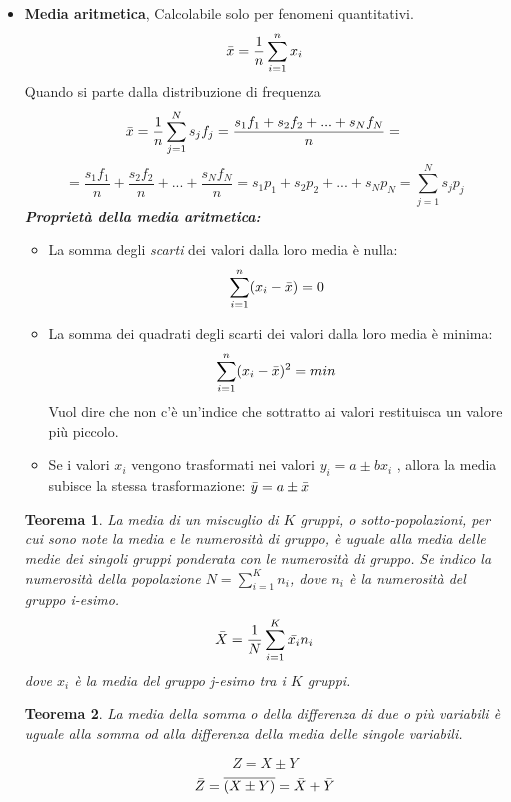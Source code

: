 \documentclass{article}
\newtheorem{teorema}{Teorema}[section]
\begin{document}
\begin{itemize}
        
        \item \textbf{Media aritmetica}, Calcolabile solo per fenomeni quantitativi. 
        $$ \Bar{x}=\frac{1}{n}\sum_{i=1}^{n}x_i$$
        Quando si parte dalla distribuzione di frequenza
        $$\Bar{x}=\frac{1}{n}\sum_{j=1}^{N}s_jf_j=\frac{s_1f_1+s_2f_2+...+s_Nf_N}{n}=\\ $$
        $$=\frac{s_1f_1}{n}+\frac{s_2f_2}{n}+...+\frac{s_Nf_N}{n}=
          s_1p_1+s_2p_2+...+s_Np_N=\sum_{j=1}^{N}s_jp_j$$ 
         \textbf{\textit{Proprietà della media aritmetica:}} 
         \begin{itemize}
             \item La somma degli \textit{scarti} dei valori dalla loro media è nulla: $$\sum_{i=1}^n (x_i-\Bar{x})=0$$
             \item La somma dei quadrati degli scarti dei valori dalla loro media è minima: $$\sum_{i=1}^n (x_i-\Bar{x})^2=min$$ Vuol dire che non c'è un'indice che sottratto ai valori restituisca un valore più piccolo. 
             \item Se i valori $x_i$ vengono trasformati nei valori $y_i = a  \pm bx_i$ , allora la media subisce la stessa trasformazione: $\Bar{y}=a\pm\Bar{x}$
         \end{itemize}{}%
         
         
             \begin{teorema} \label{T2.1}
             La media di un miscuglio di $K$ gruppi, o sotto-popolazioni, per cui sono note la media e le numerosità di gruppo, è uguale alla media delle medie dei singoli gruppi ponderata con le numerosità di gruppo.
             Se indico la numerosità della popolazione $N=\sum_{i=1}^{K}n_i$, dove $n_i$ è la numerosità del gruppo i-esimo. 
             $$ \Bar{X}=\frac{1}{N}\sum_{i=1}^{K}\Bar{x_i}n_i$$ dove $x_i$ è la media del gruppo j-esimo tra i $K$ gruppi.
             \end{teorema}
             \begin{teorema}
                La media della somma o della differenza di due o più variabili è uguale alla somma od alla
                differenza della media delle singole variabili.
                  
                  $$Z=X\pm Y$$  
                  $$\Bar{Z}= \overline{(X\pm Y)}=\Bar{X} +\bar{Y} $$
             \end{teorema}
    \end{itemize} %
    
\end{document}
